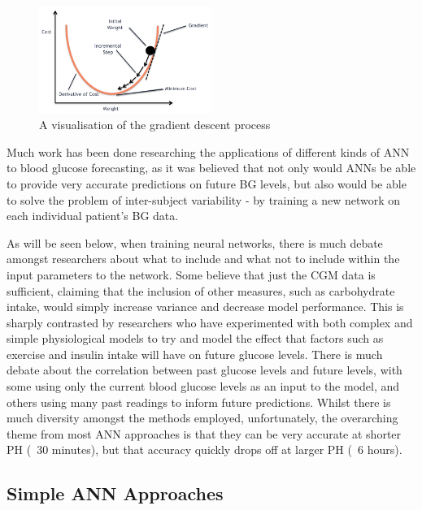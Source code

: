       \begin{figure}[H]
        \centering
        \includegraphics[width=0.5\textwidth]{images/gradientdescent.png}
        \caption{
         A visualisation of the gradient descent process\cite{whatisgdimage}
        }
      \end{figure}
      Much work has been done researching the applications of different kinds of ANN to blood glucose forecasting, as it was believed that not only would ANNs be able to provide very accurate predictions on future BG levels, but also would be able to solve the problem of inter-subject variability - by training a new network on each individual patient's BG data. 

      As will be seen below, when training neural networks, there is much debate amongst researchers about what to include and what not to include within the input parameters to the network. Some believe that just the CGM data is sufficient, claiming that the inclusion of other measures, such as carbohydrate intake, would simply increase variance and decrease model performance. This is sharply contrasted by researchers who have experimented with both complex and simple physiological models to try and model the effect that factors such as exercise and insulin intake will have on future glucose levels. There is much debate about the correlation between past glucose levels and future levels, with some using only the current blood glucose levels as an input to the model, and others using many past readings to inform future predictions. Whilst there is much diversity amongst the methods employed, unfortunately, the overarching theme from most ANN approaches is that they can be very accurate at shorter PH (~30 minutes), but that accuracy quickly drops off at larger PH (~6 hours).

      \subsection{Simple ANN Approaches}

